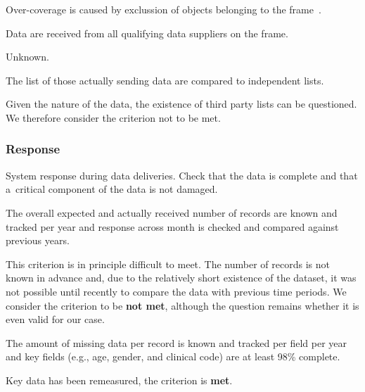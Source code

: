 Over-coverage is caused by exclussion of objects belonging to the frame~\cite{under-coverage}.

\begin{QandA}
    \item Data are received from all qualifying data suppliers on the frame.
    \begin{answered}
        Unknown.
    \end{answered}

    \item The list of those actually sending data are compared to independent lists.
    \begin{answered}
        Given the nature of the data, the existence of third party lists can be questioned.
        We therefore consider the criterion not to be met.
    \end{answered}

\end{QandA}

\subsubsection{Response}

System response during data deliveries.
Check that the data is complete and that a~critical component of the data is not damaged.

\begin{QandA}
    \item The overall expected and actually received number of records are known and tracked per year and response across month is checked and compared against previous years.
    \begin{answered}
        This criterion is in principle difficult to meet.
        The number of records is not known in advance and, due to the relatively short existence of the dataset, it was not possible until recently to compare the data with previous time periods.
        We consider the criterion to be \textbf{not met}, although the question remains whether it is even valid for our case.
    \end{answered}

    \item The amount of missing data per record is known and tracked per field per year and key fields (e.g., age, gender, and clinical code) are at least 98\% complete.
    \begin{answered}
        Key data has been remeasured, the criterion is \textbf{met}.
    \end{answered}

\end{QandA}

